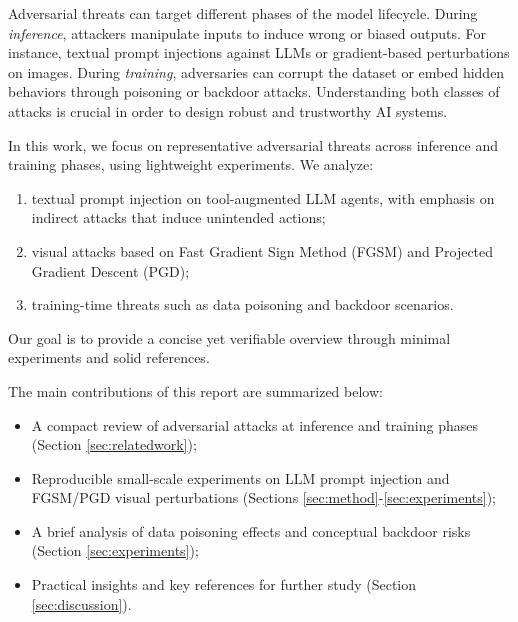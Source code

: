 \documentclass{article}
\begin{document}
Adversarial threats can target different phases of the model lifecycle. During \textit{inference}, attackers manipulate inputs to induce wrong or biased outputs. For instance, textual prompt injections against LLMs or gradient-based perturbations on images. During \textit{training}, adversaries can corrupt the dataset or embed hidden behaviors through poisoning or backdoor attacks. Understanding both classes of attacks is crucial in order to design robust and trustworthy AI systems.

In this work, we focus on representative adversarial threats across inference and training phases, using lightweight experiments. We analyze:
\begin{enumerate}[noitemsep, topsep=2pt, parsep=0pt, partopsep=0pt, leftmargin=*]
  \item textual prompt injection on tool-augmented LLM agents, with emphasis on indirect attacks that induce unintended actions;
  \item visual attacks based on Fast Gradient Sign Method (FGSM) and Projected Gradient Descent (PGD);
  \item training-time threats such as data poisoning and backdoor scenarios.
\end{enumerate}
Our goal is to provide a concise yet verifiable overview through minimal experiments and solid references.

The main contributions of this report are summarized below:
\begin{itemize}[noitemsep, topsep=2pt, parsep=0pt, partopsep=0pt, leftmargin=*]
  \item A compact review of adversarial attacks at inference and training phases (Section \ref{sec:relatedwork});
  \item Reproducible small-scale experiments on LLM prompt injection and FGSM/PGD visual perturbations (Sections \ref{sec:method}-\ref{sec:experiments});
  \item A brief analysis of data poisoning effects and conceptual backdoor risks (Section \ref{sec:experiments});
  \item Practical insights and key references for further study (Section \ref{sec:discussion}).
  \end{itemize}


\end{document}
